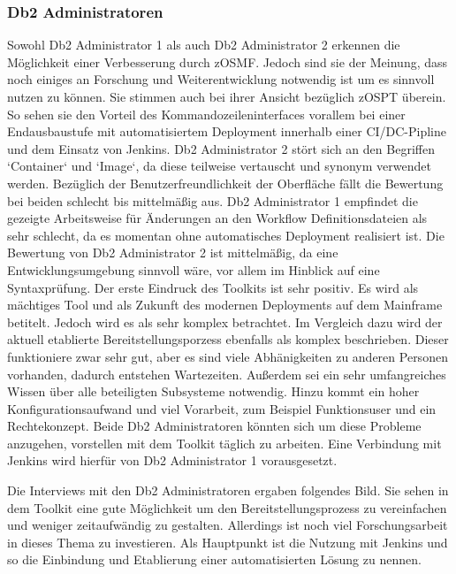 \subsubsection{Db2 Administratoren}
Sowohl Db2 Administrator 1 als auch Db2 Administrator 2 erkennen die Möglichkeit einer Verbesserung durch zOSMF.
Jedoch sind sie der Meinung, dass noch einiges an Forschung und Weiterentwicklung notwendig ist um es sinnvoll nutzen zu können.
Sie stimmen auch bei ihrer Ansicht bezüglich zOSPT überein.
So sehen sie den Vorteil des Kommandozeileninterfaces vorallem bei einer Endausbaustufe mit automatisiertem Deployment innerhalb einer CI/DC-Pipline und dem Einsatz von Jenkins.
Db2 Administrator 2 stört sich an den Begriffen `Container` und `Image`, da diese teilweise vertauscht und synonym verwendet werden.
Bezüglich der Benutzerfreundlichkeit der Oberfläche fällt die Bewertung bei beiden schlecht bis mittelmäßig aus.
Db2 Administrator 1 empfindet die gezeigte Arbeitsweise für Änderungen an den Workflow Definitionsdateien als sehr schlecht, da es momentan ohne automatisches Deployment realisiert ist.
Die Bewertung von Db2 Administrator 2 ist mittelmäßig, da eine Entwicklungsumgebung sinnvoll wäre, vor allem im Hinblick auf eine Syntaxprüfung.
Der erste Eindruck des Toolkits ist sehr positiv.
Es wird als mächtiges Tool und als Zukunft des modernen Deployments auf dem Mainframe betitelt.
Jedoch wird es als sehr komplex betrachtet.
Im Vergleich dazu wird der aktuell etablierte Bereitstellungsporzess ebenfalls als komplex beschrieben.
Dieser funktioniere zwar sehr gut, aber es sind viele Abhänigkeiten zu anderen Personen vorhanden, dadurch entstehen Wartezeiten.
Außerdem sei ein sehr umfangreiches Wissen über alle beteiligten Subsysteme notwendig.
Hinzu kommt ein hoher Konfigurationsaufwand und viel Vorarbeit, zum Beispiel Funktionsuser und ein Rechtekonzept.
Beide Db2 Administratoren könnten sich um diese Probleme anzugehen, vorstellen mit dem Toolkit täglich zu arbeiten.
Eine Verbindung mit Jenkins wird hierfür von Db2 Administrator 1 vorausgesetzt.

Die Interviews mit den Db2 Administratoren ergaben folgendes Bild.
Sie sehen in dem Toolkit eine gute Möglichkeit um den Bereitstellungsprozess zu vereinfachen und weniger zeitaufwändig zu gestalten.
Allerdings ist noch viel Forschungsarbeit in dieses Thema zu investieren.
Als Hauptpunkt ist die Nutzung mit Jenkins und so die Einbindung und Etablierung einer automatisierten Lösung zu nennen.
